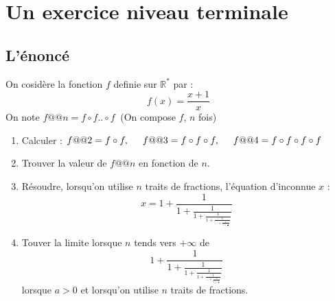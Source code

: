 \documentclass[a4paper,11pt]{book}
\newcommand{\R}{{\mathbb{R}}}
\begin{document}
\section{Un exercice niveau terminale}
\subsection{L'\'enonc\'e}
On cosid\`ere la fonction $f$ definie sur $\R^*$ par :
$$f(x)=\frac{x+1}{x}$$
On note $f@@ n=f\circ f..\circ f\ $ (On compose $f$, $n$ fois)
\begin{enumerate}
\item Calculer :
$f@@ 2=f\circ f,\hspace*{0.5cm} f@@ 3=f\circ f\circ f,\hspace*{0.5cm} f@@ 4=f\circ f\circ f\circ f$
\item Trouver la valeur de $f@@ n$ en fonction de $n$.
\item R\'esoudre, lorsqu'on utilise $n$ traits de fractions, l'\'equation 
d'inconnue $x$ :
$$x=1+\frac{1}{1+\displaystyle\frac{1}{1+\displaystyle\frac{1}{1+\displaystyle\frac{1}{...+\displaystyle\frac{1}{1+\displaystyle\frac{1}{x}}}}}}$$
\item Touver la limite lorsque $n$ tends vers $+\infty$ de
 $$1+\frac{1}{1+\displaystyle\frac{1}{1+\displaystyle\frac{1}{1+\displaystyle\frac{1}{...+\displaystyle\frac{1}{1+\displaystyle\frac{1}{a}}}}}}$$
lorsque $a>0$ et lorsqu'on utilise $n$ traits de fractions.
\end{enumerate}
\end{document}
